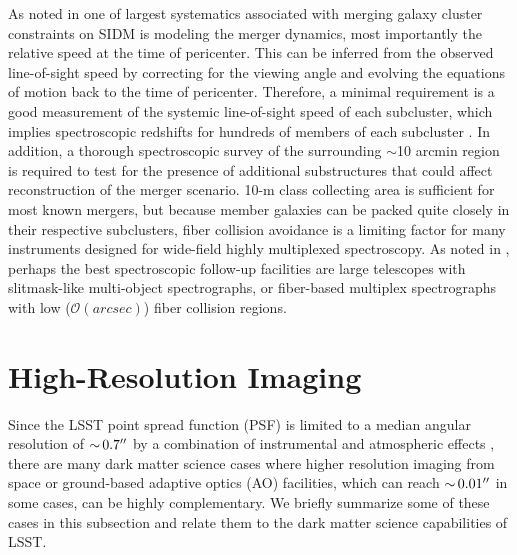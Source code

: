 As noted in  one of largest systematics associated with merging galaxy cluster constraints on SIDM is modeling the merger dynamics, most importantly the relative speed at the time of
pericenter. This can be inferred from the observed line-of-sight speed by correcting for the viewing angle and evolving the equations of motion back to the time of pericenter. Therefore, a minimal requirement is a good measurement of the systemic line-of-sight speed of each subcluster, which implies spectroscopic redshifts for hundreds of members of each subcluster \citep[\eg,][]{Golovich:2018}. In addition, a thorough spectroscopic survey of the surrounding $\sim$10 arcmin region is required to test for the presence of additional substructures that could affect reconstruction of the merger scenario. 10-m class collecting area is sufficient for most known mergers, but because member galaxies can be packed quite closely in their respective subclusters, fiber collision avoidance is a limiting factor for many instruments designed for wide-field highly multiplexed spectroscopy.  As noted in \citet{2016arXiv161001661N}, perhaps the best spectroscopic follow-up facilities are large telescopes with slitmask-like multi-object spectrographs, or fiber-based multiplex spectrographs with low ($\mathcal{O}(\unit{arcsec})$) fiber collision regions.

\section{High-Resolution Imaging }
\label{sec:highres}


Since the LSST point spread function (PSF) is limited to a median angular resolution of $ {\sim}\, 0.7''$ by a combination of instrumental and  atmospheric effects \citep{0805.2366}, there are many dark matter science cases where higher resolution imaging from space or ground-based adaptive optics (AO) facilities, which can reach $ {\sim}\, 0.01''$ in some cases, can be highly complementary. We briefly summarize some of these cases in this subsection and relate them to the dark matter science capabilities of LSST.


